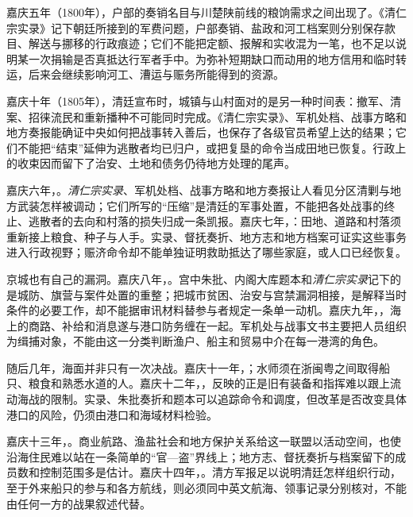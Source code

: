 嘉庆五年（1800年），户部的奏销名目与川楚陕前线的粮饷需求之间出现了。《清仁宗实录》记下朝廷所接到的军费问题，户部奏销、盐政和河工档案则分别保存款目、解送与挪移的行政痕迹；它们不能把定额、报解和实收混为一笔，也不足以说明某一次捐输是否真抵达行军者手中。为弥补短期缺口而动用的地方信用和临时转运，后来会继续影响河工、漕运与赈务所能得到的资源。

嘉庆十年（1805年），清廷宣布时，城镇与山村面对的是另一种时间表：撤军、清案、招徕流民和重新播种不可能同时完成。《清仁宗实录》、军机处档、战事方略和地方奏报能确证中央如何把战事转入善后，也保存了各级官员希望上达的结果；它们不能把“结束”延伸为逃散者均已归户，或把复垦的命令当成田地已恢复。行政上的收束因而留下了治安、土地和债务仍待地方处理的尾声。

嘉庆六年，。\textit{清仁宗实录}、军机处档、战事方略和地方奏报让人看见分区清剿与地方武装怎样被调动；它们所写的“压缩”是清廷的军事处置，不能把各处战事的终止、逃散者的去向和村落的损失归成一条凯报。嘉庆七年，：田地、道路和村落须重新接上粮食、种子与人手。实录、督抚奏折、地方志和地方档案可证实这些事务进入行政视野；赈济命令却不能单独证明救助抵达了哪些家庭，或人口已经恢复。

京城也有自己的漏洞。嘉庆八年，。宫中朱批、内阁大库题本和\textit{清仁宗实录}记下的是城防、旗营与案件处置的重整；把城市贫困、治安与宫禁漏洞相接，是解释当时条件的必要工作，却不能据审讯材料替参与者规定一条单一动机。嘉庆九年，，海上的商路、补给和消息遂与港口防务缠在一起。军机处与战事文书主要把人员组织为缉捕对象，不能由这一分类判断渔户、船主和贸易中介在每一港湾的角色。

随后几年，海面并非只有一次决战。嘉庆十一年，；水师须在浙闽粤之间取得船只、粮食和熟悉水道的人。嘉庆十二年，，反映的正是旧有装备和指挥难以跟上流动海战的限制。实录、朱批奏折和题本可以追踪命令和调度，但改革是否改变具体港口的风险，仍须由港口和海域材料检验。

嘉庆十三年，。商业航路、渔盐社会和地方保护关系给这一联盟以活动空间，也使沿海住民难以站在一条简单的“官—盗”界线上；地方志、督抚奏折与档案留下的成员数和控制范围多是估计。嘉庆十四年，。清方军报足以说明清廷怎样组织行动，至于外来船只的参与和各方航线，则必须同中英文航海、领事记录分别核对，不能由任何一方的战果叙述代替。

